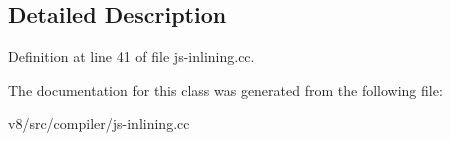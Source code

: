 \subsection{Detailed Description}


Definition at line 41 of file js-\/inlining.\+cc.



The documentation for this class was generated from the following file\+:\begin{DoxyCompactItemize}
\item 
v8/src/compiler/js-\/inlining.\+cc\end{DoxyCompactItemize}
